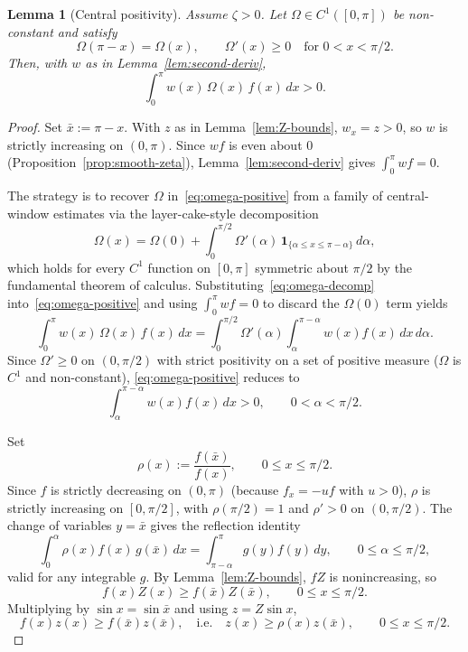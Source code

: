 \documentclass{amsart}
\newtheorem{lemma}[theorem]{Lemma}
\begin{document}
\begin{lemma}[Central positivity]\label{lem:central-positivity}
Assume $\zeta>0$. Let $\Omega\in C^1([0,\pi])$ be non-constant and
satisfy
\[
\Omega(\pi-x)=\Omega(x),\qquad \Omega'(x)\geq 0\quad\text{for }0<x<\pi/2.
\]
Then, with $w$ as in Lemma~\ref{lem:second-deriv},
\begin{equation}\label{eq:omega-positive}
\int_0^\pi w(x)\,\Omega(x)\,f(x)\,dx> 0 .
\end{equation}
\end{lemma}
\begin{proof}
Set $\bar x:=\pi-x$. With $z$ as in Lemma~\ref{lem:Z-bounds},
$w_x=z>0$, so $w$ is strictly increasing on $(0,\pi)$. Since $wf$ is
even about $0$ (Proposition~\ref{prop:smooth-zeta}),
Lemma~\ref{lem:second-deriv} gives $\int_0^\pi wf=0$.

The strategy is to recover $\Omega$ in~\eqref{eq:omega-positive} from a
family of central-window estimates via the layer-cake-style decomposition
\begin{equation}\label{eq:omega-decomp}
\Omega(x)=\Omega(0)+\int_0^{\pi/2}\Omega'(\alpha)\,
\mathbf 1_{\{\alpha\leq x\leq\pi-\alpha\}}\,d\alpha,
\end{equation}
which holds for every $C^1$ function on $[0,\pi]$ symmetric about
$\pi/2$ by the fundamental theorem of calculus.
Substituting~\eqref{eq:omega-decomp} into~\eqref{eq:omega-positive}
and using $\int_0^\pi wf=0$ to discard the $\Omega(0)$ term yields
\[
\int_0^\pi w(x)\,\Omega(x)\,f(x)\,dx
=\int_0^{\pi/2}\Omega'(\alpha)\!\int_\alpha^{\pi-\alpha}w(x)f(x)\,dx\,d\alpha.
\]
Since $\Omega'\geq 0$ on $(0,\pi/2)$ with strict positivity on a set of
positive measure ($\Omega$ is $C^1$ and non-constant),
\eqref{eq:omega-positive} reduces to
\begin{equation}\label{eq:central-positive}
\int_\alpha^{\pi-\alpha}w(x)f(x)\,dx>0,\qquad 0<\alpha<\pi/2.
\end{equation}

Set
\[
\rho(x):=\frac{f(\bar x)}{f(x)},\qquad 0\leq x\leq \pi/2.
\]
Since $f$ is strictly decreasing on $(0,\pi)$ (because $f_x=-uf$ with
$u>0$), $\rho$ is strictly increasing on $[0,\pi/2]$, with
$\rho(\pi/2)=1$ and $\rho'>0$ on $(0,\pi/2)$. The change of
variables $y=\bar x$ gives the reflection identity
\begin{equation}\label{eq:reflect-identity}
\int_0^\alpha \rho(x)f(x)\,g(\bar x)\,dx=\int_{\pi-\alpha}^\pi g(y)f(y)\,dy,
\qquad 0\leq\alpha\leq\pi/2,
\end{equation}
valid for any integrable $g$. By Lemma~\ref{lem:Z-bounds}, $fZ$ is
nonincreasing, so
\[
f(x)Z(x)\geq f(\bar x)Z(\bar x),\qquad 0\leq x\leq\pi/2.
\]
Multiplying by $\sin x=\sin\bar x$ and using $z=Z\sin x$,
\begin{equation}\label{eq:fz-reflect}
f(x)z(x)\geq f(\bar x)z(\bar x),\quad\text{i.e.}\quad
z(x)\geq\rho(x)z(\bar x),\qquad 0\leq x\leq \pi/2.
\end{equation}


\end{proof}
\end{document}
